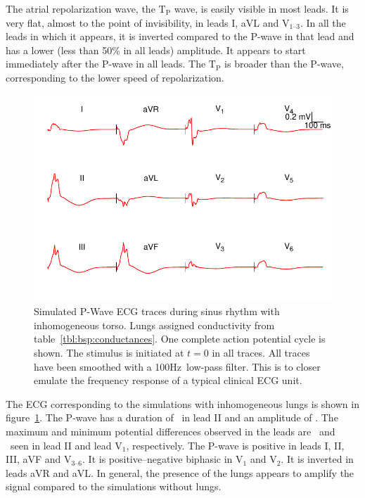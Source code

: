 The atrial repolarization wave, the $\text{T}_{\text{P}}$ wave, is easily
visible in most leads.
It is very flat, almost to the point of invisibility, in leads I, aVL and
$\text{V}_{\text{1--3}}$.
In all the leads in which it appears, it is inverted compared to the P-wave in
that lead and has a lower (less than 50\% in all leads) amplitude.
It appears to start immediately after the P-wave in all leads.
The $\text{T}_{\text{P}}$ is broader than the P-wave, corresponding to the lower
speed of repolarization.

\begin{figure}
\includegraphics{figures/bsp/ecg_lungs}
\caption[12 lead ECG during sinus rhythm, lungs present.]{
\label{bsp:fig:ecg_lungs}
Simulated P-Wave ECG traces during sinus rhythm with inhomogeneous torso.
Lungs assigned conductivity from table~\ref{tbl:bsp:conductances}.
One complete action potential cycle is shown.
The stimulus is initiated at $t = 0$ in all traces.
All traces have been smoothed with a \unit{100}{Hz}\ low-pass filter.
This is to closer emulate the frequency response of a typical clinical ECG unit.
}
\end{figure}

The ECG corresponding to the simulations with inhomogeneous lungs is shown in
figure~\ref{bsp:fig:ecg_lungs}.
The P-wave has a duration of \ in lead II and an amplitude of .
The maximum and minimum potential differences observed in the leads are
\ and \ seen in lead II and lead $\text{V}_{\text{1}}$, respectively.
The P-wave is positive in leads I, II, III, aVF and $\text{V}_{\text{3--6}}$.
It is positive--negative biphasic in $\text{V}_{\text{1}}$ and $\text{V}_{\text{2}}$.
It is inverted in leads aVR and aVL.
In general, the presence of the lungs appears to amplify the signal compared to
the simulations without lungs.

